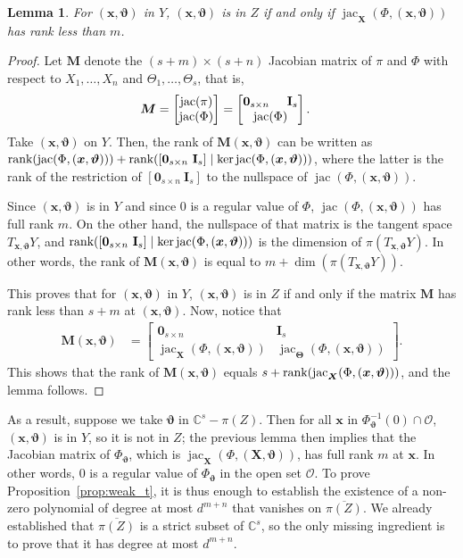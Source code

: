 \documentclass[12pt]{article}
\def\sO{\mathscr{O}}
\def\thetab{\bm{\vartheta}}
\def\xb{{\bm x}}
\DeclareMathOperator{\jac}{jac}
\def\dt{s}
\def\C{\mathbb{C}}
\def\bbm{\begin{bmatrix}}
\def\ebm{\end{bmatrix}}
\newtheorem{lemma}[theorem]{Lemma}
\begin{document}
\begin{lemma}\label{prop:rankJ}
  For $(\xb,\thetab)$ in $Y$, $(\xb,\thetab)$ is in $Z$ if and only if
  $\jac_{\bm X}(\Phi,(\xb,\thetab))$ has rank less than $m$.
\end{lemma}
\begin{proof}
  Let $\bm M$ denote the $(s+m) \times (s+n)$ Jacobian matrix of $\pi$
  and $\Phi$ with respect to $X_1,\dots,X_n$ and
  $\Theta_1,\dots,\Theta_s$, that is,
  \begin{align*}
    \bm M &= 
    \bbm 
    \jac(\pi)\\
    \jac(\Phi) 
    \ebm 
    =
    \bbm 
    \textbf{0}_{\dt \times n}\hspace{5mm}\textbf{I}_{\dt} \\
    \jac(\Phi)
    \ebm.
  \end{align*}
  Take $(\xb,\thetab)$ on $Y$. Then, the rank of $\bm M(\xb,\thetab)$
  can be written as $\textup{rank}(\jac(\Phi,(\xb,\thetab))) +
  \textup{rank}([\textbf{0}_{\dt \times n}~\textbf{I}_{\dt}] \mid \ker
   \jac(\Phi,(\xb,\thetab)))$, where the latter is the rank of the
  restriction of $[\textbf{0}_{\dt \times n}~\textbf{I}_{\dt}]$ to the
  nullspace of $\jac(\Phi,(\xb,\thetab))$.

  Since $(\xb,\thetab)$ is in $Y$ and since $0$ is a regular value of
  $\Phi$, $\jac (\Phi,(\xb,\thetab))$ has full rank $m$. On the other
  hand, the nullspace of that matrix is the tangent space
  $T_{\xb,\thetab} Y$, and $\textup{rank}([\textbf{0}_{\dt \times
      n}~\textbf{I}_{\dt}] \mid \ker \jac(\Phi,(\xb,\thetab)))$ is the
  dimension of $\pi(T_{\xb,\thetab} Y)$.  In other words, the rank of
  $\bm M(\xb,\thetab)$ is equal to $m+\dim(\pi(T_{\xb,\thetab} Y))$.

  This proves that for $(\xb,\thetab)$ in $Y$, $(\xb,\thetab)$ is in
  $Z$ if and only if the matrix $\bm M$ has rank less than $\dt+m$ at
  $(\xb,\thetab)$. Now, notice that
  \begin{align*}
   \bm M(\xb,\thetab)&= 
    \bbm 
    \textbf{0}_{\dt \times n} &\textbf{I}_{\dt} \\
     \jac_{\bm X}(\Phi,(\xb,\thetab))     &\jac_{\bm \Theta}(\Phi, (\xb,\thetab))
    \ebm.
  \end{align*}
  This shows that the rank of $\bm M(\xb,\thetab)$ 
  equals $s + \textup{rank}(\jac_{\bm X}(\Phi,(\xb,\thetab)))$,
  and  the lemma follows.
\end{proof}

As a result, suppose we take $\thetab$ in $\C^\dt - {\pi(Z)}$.  Then
for all $\xb$ in $\Phi_{\thetab}^{-1}(0) \cap \sO$, $(\xb,\thetab)$ is
in $Y$, so it is not in $Z$; the previous lemma then implies that the
Jacobian matrix of $\Phi_{\thetab}$, which is $\jac_{\bm X}(\Phi,(\bm
X,\thetab))$, has full rank $m$ at $\xb$. In other words, $0$ is a
regular value of $\Phi_{\thetab}$ in the open set $\sO$. To prove
Proposition~\ref{prop:weak_t}, it is thus enough to establish the
existence of a non-zero polynomial of degree at most $d^{m+n}$ that
vanishes on $\overline{\pi(Z)}$. We already established that
$\overline{\pi(Z)}$ is a strict subset of $\C^\dt$, so the only
missing ingredient is to prove that it has degree at most $d^{m+n}$.
\end{document}
